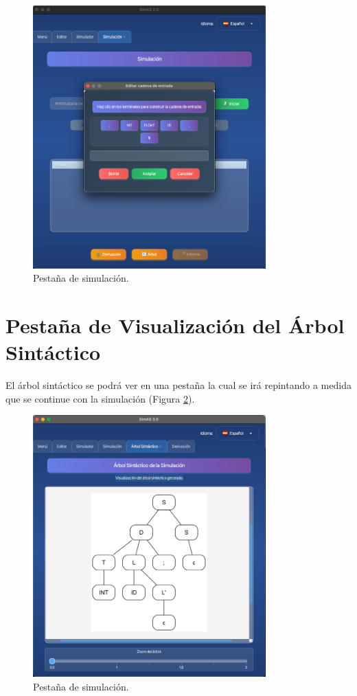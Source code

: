 \begin{figure}[htp]
\centering
	\includegraphics[width=0.8\textwidth]{figuras2/simulador/simulacion_cadenaEntrada.png}
	\caption{Pestaña de simulación.}
	\label{fig:d7}
\end{figure}

\section{Pestaña de Visualización del Árbol Sintáctico}

El árbol sintáctico se podrá ver en una pestaña la cual se irá repintando a medida que se continue con la simulación (Figura \ref{fig:da22}).

\begin{figure}[htp]
\centering
	\includegraphics[width=0.8\textwidth]{figuras2/simulador/simulacion_arbol.png}
	\caption{Pestaña de simulación.}
	\label{fig:da22}
\end{figure}

